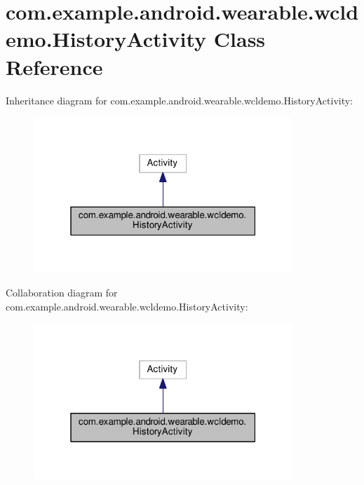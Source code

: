 \hypertarget{classcom_1_1example_1_1android_1_1wearable_1_1wcldemo_1_1HistoryActivity}{}\section{com.\+example.\+android.\+wearable.\+wcldemo.\+History\+Activity Class Reference}
\label{classcom_1_1example_1_1android_1_1wearable_1_1wcldemo_1_1HistoryActivity}


Inheritance diagram for com.\+example.\+android.\+wearable.\+wcldemo.\+History\+Activity\+:\nopagebreak
\begin{figure}[H]
\begin{center}
\leavevmode
\includegraphics[width=277pt]{d0/dc9/classcom_1_1example_1_1android_1_1wearable_1_1wcldemo_1_1HistoryActivity__inherit__graph}
\end{center}
\end{figure}


Collaboration diagram for com.\+example.\+android.\+wearable.\+wcldemo.\+History\+Activity\+:\nopagebreak
\begin{figure}[H]
\begin{center}
\leavevmode
\includegraphics[width=277pt]{da/d15/classcom_1_1example_1_1android_1_1wearable_1_1wcldemo_1_1HistoryActivity__coll__graph}
\end{center}
\end{figure}
